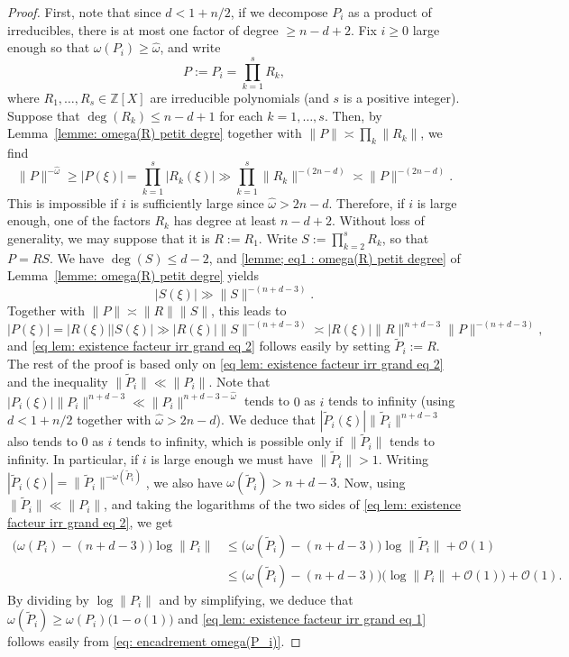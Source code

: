 \documentclass[JEP,XML,SOM,Unicode,NoFloatCountersInSection,published]{cedram}
\newcommand\bZ{\mathbb{Z}}
\newcommand\tP{\widetilde{P}}
\newcommand\GrO{\mathcal{O}}
\newcommand\homega{\widehat{\omega}}\newcommand\HH{\mathcal{H}}
\newcommand{\normH}[1]{\|#1\|}
\theoremstyle{definition}
\theoremstyle{plain}
\begin{document}
\begin{proof}
First, note that since $d < 1+n/2$, if we decompose $P_i$ as a product of irreducibles, there is at most one factor of degree $\geq n-d+2$. Fix $i\geq 0$ large enough so that $\omega(P_i) \geq \homega$, and write
\[
P:=P_i = \prod_{k=1}^s R_k,
\]
where $R_1,\dots,R_s\in\bZ[X]$ are irreducible polynomials (and $s$ is a positive integer). Suppose that $\deg(R_k) \leq n-d+1$ for each $k=1,\dots,s$. Then, by Lemma~\ref{lemme: omega(R) petit degre} together with $\normH{P} \asymp \prod_k \normH{R_k}$, we find
\begin{equation*}
\normH{P}^{-\homega}\geq |P(\xi)| = \prod_{k=1}^{s} |R_k(\xi)| \gg \prod_{k=1}^{s} \normH{R_k}^{-(2n-d)} \asymp \normH{P}^{-(2n-d)}.
\end{equation*}
This is impossible if $i$ is sufficiently large since $\homega > 2n-d$. Therefore, if $i$ is large enough, one of the factors $R_k$ has degree at least $n-d+2$. Without loss of generality, we may suppose that it is $R:=R_1$.
Write $S:= \prod_{k = 2}^{s} R_k$, so that $P=RS$. We have $\deg(S) \leq d-2$, and \eqref{lemme; eq1 : omega(R) petit degree} of Lemma~\ref{lemme: omega(R) petit degre} yields
\begin{equation*}
|S(\xi)| \gg \normH{S}^{-(n+d-3)}.
\end{equation*}
Together with $\normH{P}\asymp \normH{R}\normH{S}$, this leads to
\begin{equation*}
|P(\xi)| = |R(\xi)||S(\xi)| \gg |R(\xi)|\normH{S}^{-(n+d-3)} \asymp |R(\xi)|\normH{R}^{n+d-3}\normH{P}^{-(n+d-3)},
\end{equation*}
and \eqref{eq lem: existence facteur irr grand eq 2} follows easily by setting $\tP_i:=R$. The rest of the proof is based only on \eqref{eq lem: existence facteur irr grand eq 2} and the inequality $\normH{\tP_i} \ll \normH{P_i}$. Note that $|P_i(\xi)|\normH{P_i}^{n+d-3} \ll \normH{P_i}^{n+d-3-\homega}$ tends to $0$ as $i$ tends to infinity (using $d < 1+n/2$ together with $\homega > 2n-d$). We deduce that $|\tP_i(\xi)|\normH{\tP_i}^{n+d-3}$ also tends to $0$ as $i$ tends to infinity, which is possible only if $\normH{\tP_i}$ tends to infinity. In particular, if $i$ is large enough we must have $\normH{\tP_i} > 1$. Writing $|\tP_i(\xi)| = \normH{\tP_i}^{-\omega(\tP_i)}$, we also have $\omega(\tP_i) > n+d-3$. Now, using $\normH{\tP_i}\ll \normH{P_i}$, and taking the logarithms of the two sides of \eqref{eq lem: existence facteur irr grand eq 2}, we get
\begin{align*}
\big(\omega(P_i)-(n+d-3)\big)\log \normH{P_i} & \leq \big(\omega(\tP_i)-(n+d-3)\big)\log \normH{\tP_i} + \GrO(1) \\
& \leq \big(\omega(\tP_i)-(n+d-3)\big)\big(\log \normH{P_i}+\GrO(1)\big) + \GrO(1).
\end{align*}
By dividing by $\log \normH{P_i}$ and by simplifying, we deduce that $\omega(\tP_i) \geq \omega(P_i)\big (1 - o(1)\big)$ and \eqref{eq lem: existence facteur irr grand eq 1} follows easily from \eqref{eq: encadrement omega(P_i)}.
\end{proof}
\end{document}
